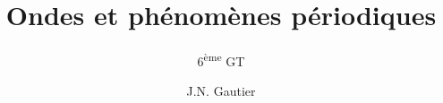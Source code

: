 

\subject{Physique(2h)}
\title{\Huge{Ondes et phénomènes périodiques}}
\subtitle{6\textsuperscript{ème} GT}
\author {J.N. Gautier}
\date{}


\maketitle







\tableofcontents
\newpage
\printallsolutions

